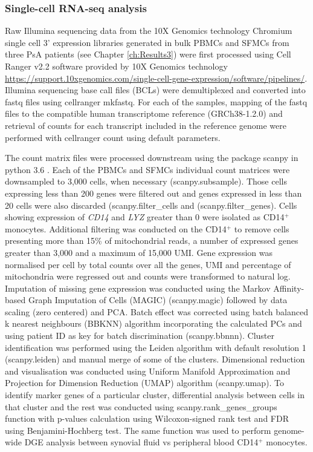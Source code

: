\subsubsection{Single-cell RNA-seq analysis}

Raw Illumina sequencing data from the 10X Genomics technology Chromium single cell 3' expression libraries generated in bulk PBMCs and SFMCs from three PsA patients (see Chapter \ref{ch:Results3}) were first processed using Cell Ranger v2.2 software provided by 10X Genomics technology \url{https://support.10xgenomics.com/single-cell-gene-expression/software/pipelines/}. Illumina sequencing base call files (BCLs) were demultiplexed and converted into fastq files using cellranger mkfastq. For each of the samples, mapping of the fastq files to the compatible human transcriptome reference (GRCh38-1.2.0) and retrieval of counts for each transcript included in the reference genome were performed with cellranger count using default parameters. 

The count matrix files were processed downstream using the package scanpy in python 3.6 \parencite{Wolf2018}. Each of the PBMCs and SFMCs individual count matrices were downsampled to 3,000 cells, when necessary (scanpy.subsample). Those cells expressing less than 200 genes were filtered out and genes expressed in less than 20 cells were also discarded (scanpy.filter\_cells and (scanpy.filter\_genes). Cells showing expression of \textit{CD14} and \textit{LYZ} greater than 0 were isolated as CD14$^+$ monocytes. Additional filtering was conducted on the CD14$^+$ to remove cells presenting more than 15\% of mitochondrial reads, a number of expressed genes greater than 3,000 and a maximum of 15,000 UMI. Gene expression was normalised per cell by total counts over all the genes, UMI and percentage of mitochondria were regressed out and counts were transformed to natural log. Imputation of missing gene expression was conducted using the Markov Affinity-based Graph Imputation of Cells (MAGIC) (scanpy.magic) \parencite{Dijk2018} followed by data scaling (zero centered) and PCA. Batch effect was corrected using batch balanced k nearest neighbours (BBKNN) algorithm incorporating the calculated PCs and using patient ID as key for batch discrimination (scanpy.bbnnn). Cluster identification was performed using the Leiden algorithm with default resolution 1 (scanpy.leiden) \parencite{Traag2018} and manual merge of some of the clusters. Dimensional reduction and visualisation was conducted using Uniform Manifold Approximation and Projection for Dimension Reduction (UMAP) algorithm (scanpy.umap). To identify marker genes of a particular cluster, differential analysis between cells in that cluster and the rest was conducted using scanpy.rank\_genes\_groups function with p-values calculation using Wilcoxon-signed rank test and FDR using Benjamini-Hochberg test. The same function was used to perform genome-wide DGE analysis between synovial fluid vs peripheral blood CD14$^+$ monocytes.



